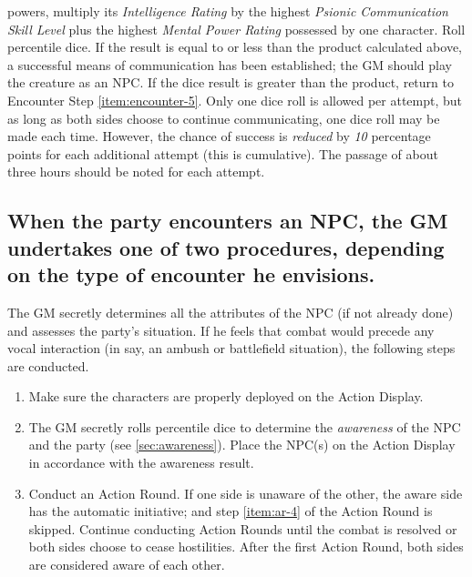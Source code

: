 \begin{table}[htbp]
{\begin{minipage}{0.95\textwidth}
\begin{minipage}{0.95\textwidth}
\begin{multicols}{2}
          powers, multiply its \emph{Intelligence Rating} by the highest
          \emph{Psionic Communication Skill Level} plus the highest
          \emph{Mental Power Rating} possessed by one character. Roll
          percentile dice. If the result is equal to or less than the
          product calculated above, a successful means of communication
          has been established; the GM should play the creature as an
          NPC. If the dice result is greater than the product, return to
          Encounter Step \ref{item:encounter-5}. Only one dice roll is
          allowed per attempt, 
          but as long as both sides choose to continue communicating,
          one dice roll may be made each time. However, the chance of
          success is \emph{reduced} by \emph{10} percentage points for
          each additional 
          attempt (this is cumulative).  The passage of about three
          hours should be noted for each attempt.
        \end{multicols}
      \end{minipage}

      \medskip
    \end{minipage}}
\end{table}


\subsection[NPC Encounters]{When the party encounters an NPC, the GM
  undertakes one of two procedures, depending on the type of encounter
  he envisions.} 
\label{sec:npc-encounters}



The GM secretly determines all the attributes of the NPC (if not
already done) and assesses the party's situation. If he feels that
combat would precede any vocal interaction (in say, an ambush or
battlefield situation), the following steps are conducted.

\begin{enumerate}
\item Make sure the characters are properly deployed on the Action Display. 
\item The GM secretly rolls percentile dice to determine the
  \emph{awareness} of the NPC and the party (see \ref{sec:awareness}).
  Place the NPC(s) on the Action Display in accordance with the
  awareness result.
\item Conduct an Action Round. If one side is unaware of the other,
  the aware side has the automatic initiative; and step \ref{item:ar-4} of the
  Action Round is skipped. Continue conducting Action Rounds until the
  combat is resolved or both sides choose to cease hostilities. After
  the first Action Round, both sides are considered aware of each
  other.
\end{enumerate}

